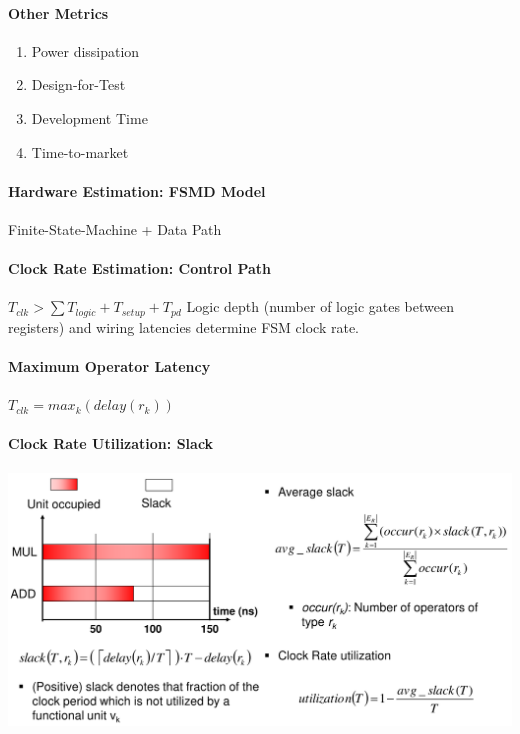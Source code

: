 \documentclass[english]{latex4ei/latex4ei_sheet}
\begin{document}
\paragraph{Other Metrics}
\begin{enumerate}
	\item Power dissipation
	\item Design-for-Test
	\item Development Time
	\item Time-to-market
\end{enumerate}

\paragraph{Hardware Estimation: FSMD Model}
Finite-State-Machine + Data Path

\paragraph{Clock Rate Estimation: Control Path}
$T_{clk} > \sum T_{logic} + T_{setup} + T_{pd}$
Logic depth (number of logic gates between registers) and wiring latencies determine FSM clock rate.

\paragraph{Maximum Operator Latency}
$T_{clk} = max_k(delay(r_k))$

\paragraph{Clock Rate Utilization: Slack}

\begin{center}
  \includegraphics[width=\linewidth]{assets/Slack.png}
  \label{fig:slack}
\end{center}
\end{document}
